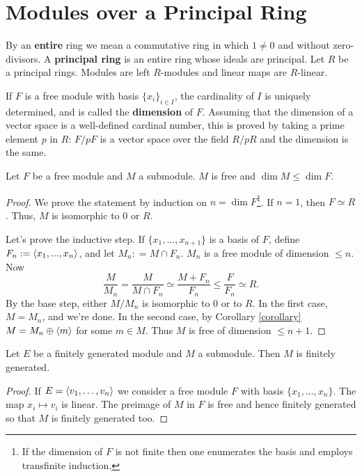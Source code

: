 
\section{Modules over a Principal Ring} By an \textbf{entire} ring we mean a commutative ring in which $1\neq 0$ and without zero-divisors. 
A \textbf{principal ring} is an entire ring whose ideals are principal.
Let $R$ be a principal rings. Modules are left $R$-modules and linear maps are $R$-linear.

If $F$ is a free module with basis $\{x_i\}_{i \in I}$, the cardinality of $I$ is uniquely determined,  and is called the \textbf{dimension} of $F$. 
Assuming that the dimension of a vector space is a well-defined cardinal number, this is proved by taking a prime element $p$ in $R$: $F/pF$ is a vector space over the field $R/pR$ and the dimension is the same. 

\begin{thm} 
Let $F$ be a free module and $M$ a submodule. 
$M$ is free and $\dim M \le \dim F$. 
\begin{proof} 
We prove the statement by induction on $n=\dim F$\footnote{If the dimension of $F$ is not finite then one enumerates the basis and employs transfinite induction.}. 
If $n = 1$, then $F \simeq R$. 
Thus, $M$ is isomorphic to $0$ or $R$. 

Let's prove the inductive step. 
If $\{x_1, \ldots, x_{n+1}\}$ is a basis of $F$, define $F_n := \langle x_1,...,x_n\rangle$, and let $M_n: = M \cap F_n$. 
$M_n$ is a free module of dimension $ \le n$. 
Now
$$\frac{M}{M_n} = \frac{M}{M \cap F_n} \simeq \frac{M + F_n }{ F_n } \le \frac{F}{ F_n } \simeq R\text{.} $$
By the base step, either $M/M_n$ is isomorphic to $ 0$ or to $R$. 
In the first case, $M = M_n$, and we're done. 
In the second case, by Corollary \ref{corollary} $M = M_n \oplus \langle m\rangle$ for some $m \in M$. 
Thus $M$ is free of dimension $\le n+1$.
\end{proof}
\end{thm}

\begin{cor} Let $E$ be a finitely generated module and $M$ a submodule. 
Then $M$ is finitely generated. 
\begin{proof} If $E=\langle v_1, \ldots, v_n\rangle$ we consider a free module $F$ with basis $\{x_1, \ldots, x_n\}$. 
The map $x_i \mapsto v_i$ is linear. 
The preimage of $M$ in $F$ is free and hence finitely generated so that $M$ is finitely generated too.  
\end{proof}
\end{cor}

